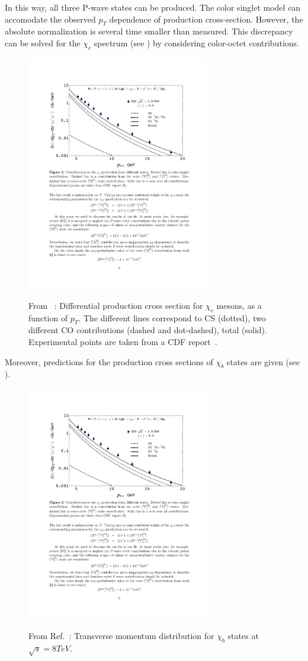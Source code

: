 In this way, all three P-wave states can be produced. The color singlet model
can accomodate the observed $p_T$ dependence of production cross-section.
However, the absolute normalization is several time smaller than measured. This
discrepancy can be solved for the $\chi_c$ spectrum (see )
by considering color-octet contributions.

\begin{figure}
\center
\includegraphics[width=300px]{figs/review/chibprod_fig2.pdf}
\label{chibprod_fig2} 
\caption{From ~\cite{chibprod}: Differential production cross section for $\chi_c$ mesons, 
as a function of $p_T$. The different lines correspond to CS (dotted), two different CO 
contributions (dashed and dot-dashed), total (solid). Experimental points are taken from a 
CDF report~\cite{CDFchic}.}
\end{figure} 

Moreover, predictions for the production cross sections of $\chi_b$ states are
given (see ).

\begin{figure}
\center
\includegraphics[width=300px]{figs/review/chibprod_fig3.pdf}
\label{chibprod_fig3} 
\caption{From Ref.~\cite{chibprod}: Transverse momentum distribution for $\chi_b$ states at 
$\sqrt{s}=8TeV$.}
\end{figure} 

